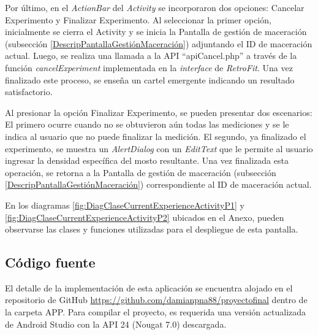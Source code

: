             \par Por último, en el \textit{ActionBar} del \textit{Activity} se incorporaron dos opciones: Cancelar Experimento y Finalizar Experimento. Al seleccionar la primer opción, inicialmente se cierra el Activity y se inicia la Pantalla de gestión de maceración (subsección \ref{DescripPantallaGestiónMaceración}) adjuntando el ID de maceración actual. Luego, se realiza una llamada a la API ``apiCancel.php'' a través de la función \textit{cancelExperiment} implementada en la \textit{interface} de \textit{RetroFit}. Una vez finalizado este proceso, se enseña un cartel emergente indicando un resultado satisfactorio.
            
            \par Al presionar la opción Finalizar Experimento, se pueden presentar dos escenarios: El primero ocurre cuando no se obtuvieron aún todas las mediciones y se le indica al usuario que no puede finalizar la medición. El segundo, ya finalizado el experimento, se muestra un \textit{AlertDialog} con un \textit{EditText} que le permite al usuario ingresar la densidad específica del mosto resultante. Una vez finalizada esta operación, se retorna a la Pantalla de gestión de maceración (subsección \ref{DescripPantallaGestiónMaceración}) correspondiente al ID de maceración actual.
            
            \par En los diagramas \ref{fig:DiagClaseCurrentExperienceActivityP1} y \ref{fig:DiagClaseCurrentExperienceActivityP2} ubicados en el Anexo, pueden observarse las clases y funciones utilizadas para el despliegue de esta pantalla.
            
    \subsection{Código fuente}
    \par El detalle de la implementación de esta aplicación se encuentra alojado en el repositorio de GitHub \url{https://github.com/damianpna88/proyectofinal} dentro de la carpeta APP. Para compilar el proyecto, es requerida una versión actualizada de Android Studio con la API 24 (Nougat 7.0) descargada.